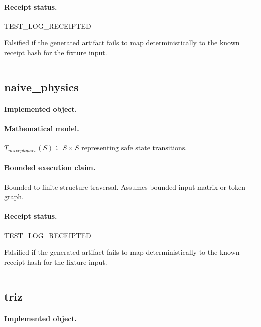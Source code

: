 \paragraph{Receipt status.} TEST\_LOG\_RECEIPTED
\begin{falsifier}
Falsified if the generated artifact fails to map deterministically to the known receipt hash for the fixture input.
\end{falsifier}

\vspace{1em}\hrule\vspace{1em}
\subsection{naive\_physics}
\paragraph{Implemented object.} 
\paragraph{Mathematical model.} $T_{naivephysics}(S) \subseteq S \times S \text{ representing safe state transitions}.$
\paragraph{Bounded execution claim.} Bounded to finite structure traversal. Assumes bounded input matrix or token graph.
\paragraph{Receipt status.} TEST\_LOG\_RECEIPTED
\begin{falsifier}
Falsified if the generated artifact fails to map deterministically to the known receipt hash for the fixture input.
\end{falsifier}

\vspace{1em}\hrule\vspace{1em}
\subsection{triz}
\paragraph{Implemented object.} 
